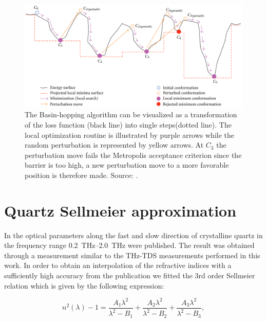 \begin{figure}[h]
    \centering
    \includegraphics[scale=0.3]{images/appendix/bh.png}
    \caption{The Basin-hopping algorithm can be visualized as a transformation of the loss function (black line) into single steps(dotted line). 
    The local optimization routine is illustrated by purple arrows while the random perturbation is represented by yellow arrows. At $C_3$ the perturbation move fails the Metropolis acceptance criterion since the barrier is too high, a new perturbation move to a more favorable position is therefore made. Source: \cite{Olson2012}.}
    \label{fig:Basin-hopping}
\end{figure}

\section{Quartz Sellmeier approximation}
\label{sec:sellmeier}
In \cite{DGrischkowsky1990} the optical parameters along the fast and slow direction of crystalline quartz in the frequency range \SIrange{0.2}{2.0}{\tera\hertz} were published. The result was obtained through a measurement similar to the THz-TDS measurements performed in this work. In order to obtain an interpolation of the refractive indices with a sufficiently high accuracy from the publication we fitted the 3rd order Sellmeier relation which is given by the following expression:

\begin{equation}
    \label{eq:sellmeier}
    n^2(\lambda) - 1 = \frac{A_1\lambda^2}{\lambda^2-B_1}+\frac{A_2\lambda^2}{\lambda^2-B_2}+\frac{A_3\lambda^2}{\lambda^2-B_3},
\end{equation}

